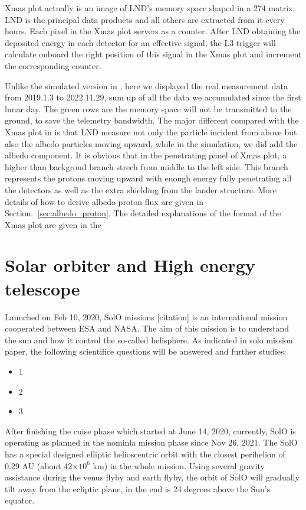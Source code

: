 Xmas plot actually is an image of \ac{LND}'s memory space shaped in a 274  matrix. LND is the principal data products and all others are extracted from it every hours. Each pixel in the Xmas plot servers as a counter. After LND obtaining the deposited energy in each detector for an effective signal, the L3 trigger will calculate onboard the right position of this signal in the Xmas plot and increment the corresponding counter. 

Unlike the simulated version in \citep{Wimmer2020SSRv}, here we displayed the real measurement data from 2019.1.3 to 2022.11.29, sum up of all the data we accumulated since the first lunar day. The green rows are the memory space will not be transmitted to the ground, to save the telemetry bandwidth. The major different compared with the Xmas plot in \citep{Wimmer2020SSRv} is that LND measure not only the particle incident from above but also the albedo particles moving upward, while in the simulation, we did add the albedo component. It is obvious that in the penetrating panel of Xmas plot,  a higher than backgrond branch strech from middle to the left side. This branch represents the protons moving upward with enough energy fully penetrating all the detectors as well as the extra shielding from the lander structure. More details of how to derive albedo proton flux are given in Section.~\ref{sec:albedo_proton}.
The detailed explanations of the format of the Xmas plot are given in the \citep{Wimmer2020SSRv}


\section{Solar orbiter and High energy telescope}

Launched on Feb 10, 2020, \acl{SolO} missions [citation] is an international mission cooperated between \ac{ESA} and \ac{NASA}. The aim of this mission is to understand the sun and how it control the so-called helisphere. As indicated in solo mission paper, the following scientifice questions will be answered and further studies:
\begin{itemize}
	\item 1
	\item 2
	\item 3
\end{itemize}
After finishing the cuise phase which started at June 14, 2020, currently, \ac{SolO} is operating as planned in the nominla mission phase since Nov 26, 2021.
The \ac{SolO} has a special designed elliptic helioscentric orbit with the closest perihelion of 0.29 AU (about 42$\times10^6$ km) in the whole mission. Using several gravity assistance during the venus flyby and earth flyby, the orbit of SolO will gradually tilt away from the ecliptic plane, in the end is 24 degrees above the Sun's equator.

